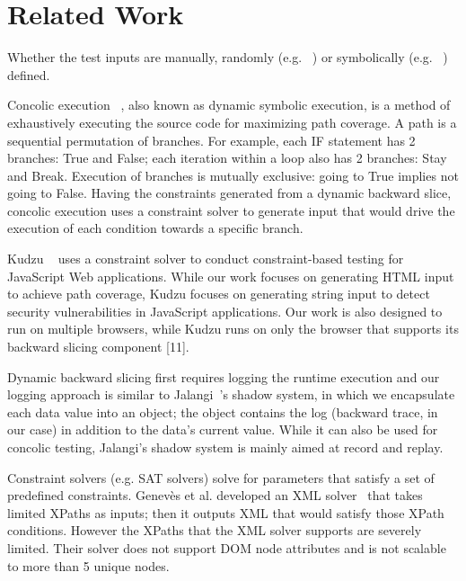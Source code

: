 \section{Related Work}
Whether the test inputs are manually, randomly (e.g. ~\cite{artemis}) or symbolically (e.g. ~\cite{kudzu, jalangi}) defined.



Concolic execution ~\cite{cute}, also known as dynamic symbolic execution, is a method of exhaustively executing the source code for maximizing path coverage. 
A path is a sequential permutation of branches.  For example, each IF statement has 2 branches: True and False; each iteration within a loop also has 2 branches: Stay and Break. 
Execution of branches is mutually exclusive: going to True implies not going to False.
Having the constraints generated from a dynamic backward slice, concolic execution uses a constraint solver to generate input that would drive the execution of each condition towards a specific branch. 

Kudzu ~\cite{kudzu} uses a constraint solver to conduct constraint-based testing for JavaScript Web applications. 
While our work focuses on generating HTML input to achieve path coverage, Kudzu focuses on generating string input to detect security vulnerabilities in JavaScript applications. 
Our work is also designed to run on multiple browsers, while Kudzu runs on only the browser that supports its backward slicing component [11].

Dynamic backward slicing first requires logging the runtime execution and our logging approach is similar to Jalangi~\cite{jalangi}'s shadow system, in which we encapsulate each data value into an object; the object contains the log (backward trace, in our case) in addition to the data’s current value. While it can also be used for concolic testing, Jalangi’s shadow system is mainly aimed at record and replay.  

Constraint solvers (e.g. SAT solvers) solve for parameters that satisfy a set of predefined constraints.  
Genevès et al. developed an XML solver~\cite{xmlsolver} that takes limited XPaths as inputs; then it outputs XML that would satisfy those XPath conditions. 
However the XPaths that the XML solver supports are severely limited. Their solver does not support DOM node attributes and is not scalable to more than 5 unique nodes. 

